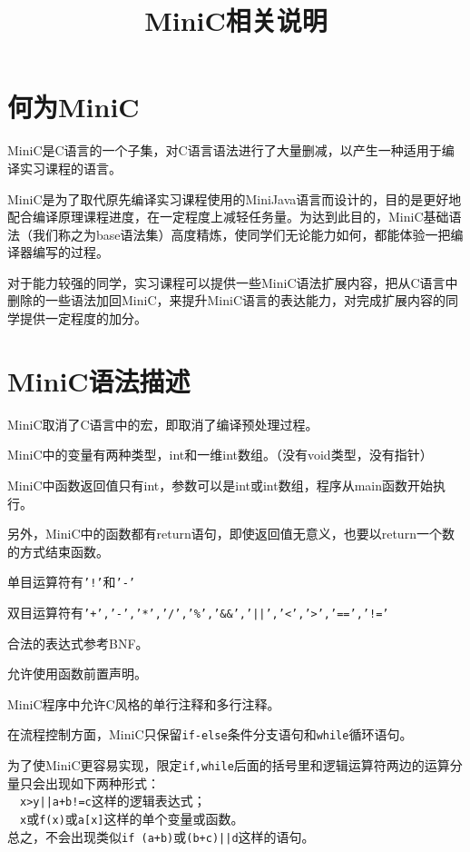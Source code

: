 \documentclass{ctexart}
\title{MiniC相关说明}
\date{}
\author{}
\begin{document}
\maketitle

\section{何为MiniC}
MiniC是C语言的一个子集，对C语言语法进行了大量删减，以产生一种适用于编译实习课程的语言。

MiniC是为了取代原先编译实习课程使用的MiniJava语言而设计的，目的是更好地配合编译原理课程进度，在一定程度上减轻任务量。为达到此目的，MiniC基础语法（我们称之为base语法集）高度精炼，使同学们无论能力如何，都能体验一把编译器编写的过程。

对于能力较强的同学，实习课程可以提供一些MiniC语法扩展内容，把从C语言中删除的一些语法加回MiniC，来提升MiniC语言的表达能力，对完成扩展内容的同学提供一定程度的加分。

\section{MiniC语法描述}
MiniC取消了C语言中的宏，即取消了编译预处理过程。

MiniC中的变量有两种类型，int和一维int数组。（没有void类型，没有指针）

MiniC中函数返回值只有int，参数可以是int或int数组，程序从main函数开始执行。

另外，MiniC中的函数都有return语句，即使返回值无意义，也要以return一个数的方式结束函数。

单目运算符有\texttt{'!'}和\texttt{'-'}

双目运算符有\texttt{'+','-','*','/','\%','\&\&','||','\textless','\textgreater','==','!='}

合法的表达式参考BNF。

允许使用函数前置声明。

MiniC程序中允许C风格的单行注释和多行注释。

在流程控制方面，MiniC只保留\texttt{if-else}条件分支语句和\texttt{while}循环语句。

为了使MiniC更容易实现，限定\texttt{if,while}后面的括号里和逻辑运算符两边的运算分量只会出现如下两种形式：\\
\indent\ \ \texttt{x>y||a+b!=c}这样的逻辑表达式；\\
\indent\ \ \texttt{x}或\texttt{f(x)}或\texttt{a[x]}这样的单个变量或函数。\\
\indent 总之，不会出现类似\texttt{if (a+b)}或\texttt{(b+c)||d}这样的语句。
\end{document}
